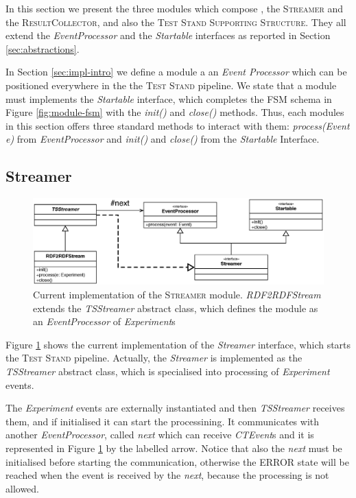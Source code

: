 In this section we present the three modules which compose \namens, the \textsc{Streamer} and the \textsc{ResultCollector}, and also the \textsc{Test Stand Supporting Structure}. They all extend the \textit{EventProcessor} and the \textit{Startable} interfaces as reported in Section \ref{sec:abstractions}.

In Section \ref{sec:impl-intro} we define a module a an \textit{Event Processor} which can be positioned everywhere in the the \textsc{Test Stand} pipeline. We state that a module must implements the \textit{Startable} interface, which completes the FSM schema in Figure \ref{fig:module-fsm} with the \textit{init()} and \textit{close()} methods.
Thus, each modules in this section offers three standard methods to interact with them: \textit{process(Event e)} from \textit{EventProcessor} and \textit{init()} and \textit{close()} from the \textit{Startable} Interface.

\subsection{Streamer}	\label{sec:streamer-impl}
\begin{figure}[tbh]
  \centering
	\includegraphics[width=\linewidth]{images/uml_tstreamer}
	\caption[\textit{RDF2RDFStream \textsc{Streamer} Implementation} - UML Schema]{Current implementation of the \textsc{Streamer} module. \textit{RDF2RDFStream} extends the \textit{TSStreamer} abstract class, which defines the module as an \textit{EventProcessor} of \textit{Experiment}s} 
  	\label{fig:uml_tstreamer}
\end{figure}

\noindent Figure \ref{fig:uml_tstreamer} shows the current implementation of the \textit{Streamer} interface, which starts the \textsc{Test Stand} pipeline. Actually, the \textit{Streamer} is implemented as the \textit{TSStreamer} abstract class, which is specialised into processing of \textit{Experiment} events. 

The \textit{Experiment} events are  externally instantiated and then \textit{TSStreamer} receives them, and if initialised it can start the processining. It communicates with another \textit{EventProcessor}, called \textit{next} which can receive  \textit{CTEvent}s and it is represented in Figure \ref{fig:uml_tstreamer} by the labelled arrow.  Notice that also the \textit{next} must be initialised before starting the communication, otherwise the ERROR state will be reached when the event is received by the \textit{next}, because the processing is not allowed.

